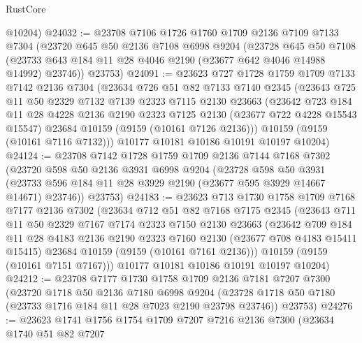 \begin{lexlean}{RustCore}
\begin{coremodule}
      @10204)
@24032 := @23708
    @7106
    @1726
    @1760
    @1709
    @2136
    @7109
    @7133
    @7304
    (@23720
      @645
      @50
      @2136
      @7108
      @6998
      @9204
      (@23728
        @645
        @50
        @7108
        (@23733 @643 @184 @11 @28 @4046 @2190 (@23677 @642 @4046 @14988 @14992) @23746))
      @23753)
@24091 := @23623
    @727
    @1728
    @1759
    @1709
    @7133
    @7142
    @2136
    @7304
    (@23634
      @726
      @51
      @82
      @7133
      @7140
      @2345
      (@23643
        @725
        @11
        @50
        @2329
        @7132
        @7139
        @2323
        @7115
        @2130
        @23663
        (@23642
          @723
          @184
          @11
          @28
          @4228
          @2136
          @2190
          @2323
          @7125
          @2130
          (@23677 @722 @4228 @15543 @15547)
          @23684
          @10159
          (@9159 (@10161 @7126 @2136)))
        @10159
        (@9159 (@10161 @7116 @7132)))
      @10177
      @10181
      @10186
      @10191
      @10197
      @10204)
@24124 := @23708
    @7142
    @1728
    @1759
    @1709
    @2136
    @7144
    @7168
    @7302
    (@23720
      @598
      @50
      @2136
      @3931
      @6998
      @9204
      (@23728
        @598
        @50
        @3931
        (@23733 @596 @184 @11 @28 @3929 @2190 (@23677 @595 @3929 @14667 @14671) @23746))
      @23753)
@24183 := @23623
    @713
    @1730
    @1758
    @1709
    @7168
    @7177
    @2136
    @7302
    (@23634
      @712
      @51
      @82
      @7168
      @7175
      @2345
      (@23643
        @711
        @11
        @50
        @2329
        @7167
        @7174
        @2323
        @7150
        @2130
        @23663
        (@23642
          @709
          @184
          @11
          @28
          @4183
          @2136
          @2190
          @2323
          @7160
          @2130
          (@23677 @708 @4183 @15411 @15415)
          @23684
          @10159
          (@9159 (@10161 @7161 @2136)))
        @10159
        (@9159 (@10161 @7151 @7167)))
      @10177
      @10181
      @10186
      @10191
      @10197
      @10204)
@24212 := @23708
    @7177
    @1730
    @1758
    @1709
    @2136
    @7181
    @7207
    @7300
    (@23720
      @1718
      @50
      @2136
      @7180
      @6998
      @9204
      (@23728 @1718 @50 @7180 (@23733 @1716 @184 @11 @28 @7023 @2190 @23798 @23746))
      @23753)
@24276 := @23623
    @1741
    @1756
    @1754
    @1709
    @7207
    @7216
    @2136
    @7300
    (@23634
      @1740
      @51
      @82
      @7207

\end{coremodule}
\end{lexlean}
